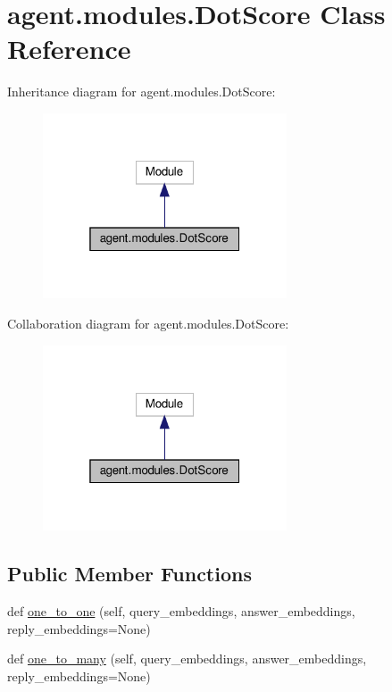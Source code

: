 \hypertarget{classagent_1_1modules_1_1DotScore}{}\section{agent.\+modules.\+Dot\+Score Class Reference}
\label{classagent_1_1modules_1_1DotScore}


Inheritance diagram for agent.\+modules.\+Dot\+Score\+:
\nopagebreak
\begin{figure}[H]
\begin{center}
\leavevmode
\includegraphics[width=205pt]{classagent_1_1modules_1_1DotScore__inherit__graph}
\end{center}
\end{figure}


Collaboration diagram for agent.\+modules.\+Dot\+Score\+:
\nopagebreak
\begin{figure}[H]
\begin{center}
\leavevmode
\includegraphics[width=205pt]{classagent_1_1modules_1_1DotScore__coll__graph}
\end{center}
\end{figure}
\subsection*{Public Member Functions}
\begin{DoxyCompactItemize}
\item 
def \hyperlink{classagent_1_1modules_1_1DotScore_adb19e68bfefc47730309975dbc2c9ab3}{one\+\_\+to\+\_\+one} (self, query\+\_\+embeddings, answer\+\_\+embeddings, reply\+\_\+embeddings=None)
\item 
def \hyperlink{classagent_1_1modules_1_1DotScore_aa997866489a5019a9b19b702b0e48d39}{one\+\_\+to\+\_\+many} (self, query\+\_\+embeddings, answer\+\_\+embeddings, reply\+\_\+embeddings=None)
\end{DoxyCompactItemize}


